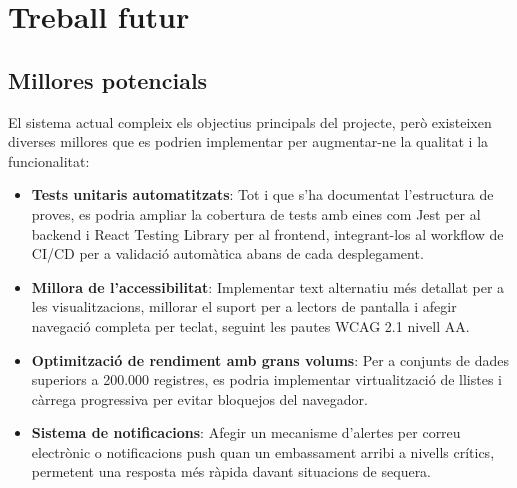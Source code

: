 

\chapter{Treball futur}
\label{Ch:FutureWork}


\section{Millores potencials}

El sistema actual compleix els objectius principals del projecte, però existeixen diverses millores que es podrien implementar per augmentar-ne la qualitat i la funcionalitat:

\begin{itemize}
    \item \textbf{Tests unitaris automatitzats}: Tot i que s'ha documentat l'estructura de proves, es podria ampliar la cobertura de tests amb eines com Jest per al backend i React Testing Library per al frontend, integrant-los al workflow de CI/CD per a validació automàtica abans de cada desplegament.
    
    \item \textbf{Millora de l'accessibilitat}: Implementar text alternatiu més detallat per a les visualitzacions, millorar el suport per a lectors de pantalla i afegir navegació completa per teclat, seguint les pautes WCAG 2.1 nivell AA.
    
    \item \textbf{Optimització de rendiment amb grans volums}: Per a conjunts de dades superiors a 200.000 registres, es podria implementar virtualització de llistes i càrrega progressiva per evitar bloquejos del navegador.
    
    \item \textbf{Sistema de notificacions}: Afegir un mecanisme d'alertes per correu electrònic o notificacions push quan un embassament arribi a nivells crítics, permetent una resposta més ràpida davant situacions de sequera.
\end{itemize}


